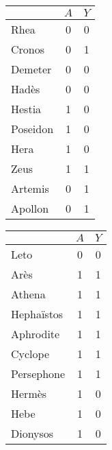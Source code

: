 \documentclass{standalone}
\begin{document}
\begin{tabular}{l|c|c|}
			 & $A $ & $Y$ \\
			\hline
			Rhea & 0 & 0\\
			Cronos & 0 & 1\\
			Demeter &0 & 0\\
			Hadès & 0 & 0\\
			Hestia & 1 & 0\\
			Poseidon & 1 & 0 \\
			Hera & 1 & 0\\
			Zeus & 1 &1 \\
			Artemis & 0 & 1\\
			Apollon& 0 & 1
	\end{tabular}
 \begin{tabular}{l|c|c|}
			 & $A $ & $Y$ \\
			\hline
			Leto & 0 & 0\\
			Arès & 1  & 1\\
			Athena & 1  & 1\\
			Hephaïstos & 1  & 1\\
			Aphrodite & 1  & 1 \\
			Cyclope & 1  & 1\\
			Persephone & 1  & 1 \\
			Hermès &1 & 0\\
			Hebe & 1 & 0 \\
			Dionysos & 1 & 0 
	\end{tabular}
\end{document}
